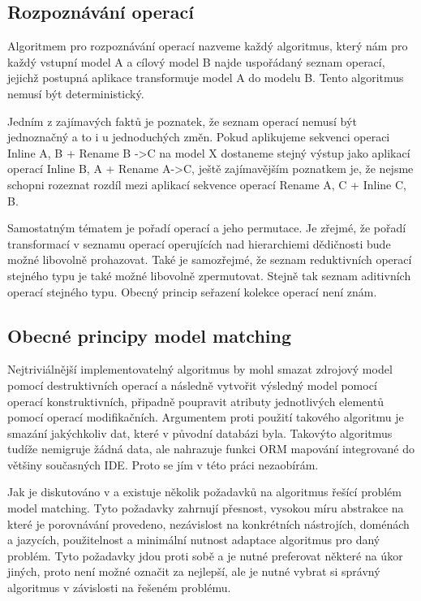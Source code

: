 \documentclass[11pt,twoside,a4paper]{book}
\begin{document}
\FloatBarrier

\subsection{Rozpoznávání operací}

Algoritmem pro rozpoznávání operací nazveme každý algoritmus, který nám pro
každý vstupní model A a cílový model B najde uspořádaný seznam operací, jejichž
postupná aplikace transformuje model A do modelu B. Tento algoritmus nemusí být
deterministický.

Jedním z zajímavých faktů je poznatek, že seznam operací nemusí být jednoznačný
a to i u jednoduchých změn. Pokud aplikujeme sekvenci operaci Inline A, B + 
Rename B ->C na model X dostaneme stejný výstup jako aplikací operací Inline B,
A + Rename A->C, ještě zajímavějším poznatkem je, že nejsme schopni rozeznat
rozdíl mezi aplikací sekvence operací Rename A, C + Inline C, B.

Samostatným tématem je pořadí operací a jeho permutace. Je zřejmé, že pořadí
transformací v seznamu operací operujících nad hierarchiemi dědičnosti bude
možné libovolně prohazovat.
Také je samozřejmé, že seznam reduktivních operací stejného typu je také možné
libovolně zpermutovat. Stejně tak seznam aditivních operací stejného typu.
Obecný princip seřazení kolekce operací není znám. 

\subsection{Obecné principy model matching} \label{model_matching_principles}
Nejtriviálnější implementovatelný algoritmus by mohl smazat zdrojový model
pomocí destruktivních operací a následně vytvořit výsledný model pomocí operací
konstruktivních, připadně poupravit atributy jednotlivých elementů pomocí
operací modifikačních. Argumentem proti použití takového algoritmu je smazání
jakýchkoliv dat, které v původní databázi byla. Takovýto algoritmus tudíže
nemigruje žádná data, ale nahrazuje funkci ORM mapování integrované
do většiny současných IDE. Proto se jím v této práci nezaobírám.

Jak je diskutováno v \cite{diff_merge_diagrams} a
\cite{Kolovos:Different_models} existuje několik požadavků na algoritmus řešící
problém model matching. Tyto požadavky zahrnují přesnost, vysokou míru
abstrakce na které je porovnávání provedeno, nezávislost na konkrétních
nástrojích, doménách a jazycích, použitelnost a minimální nutnost adaptace
algoritmus pro daný problém. Tyto požadavky jdou proti sobě a je nutné
preferovat některé na úkor jiných, proto není možné označit za nejlepší, ale je
nutné vybrat si správný algoritmus v závislosti na řešeném problému.
\end{document}
